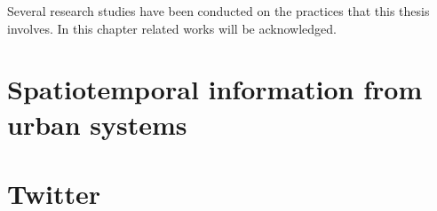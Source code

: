 Several research studies have been conducted on the practices that this thesis involves. In this chapter related works will be acknowledged.

\section{Spatiotemporal information from urban systems}


\section{Twitter}
